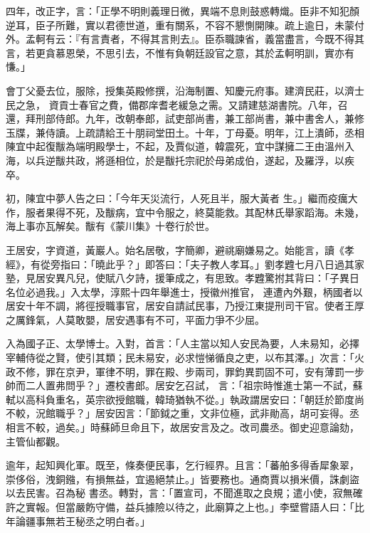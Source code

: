 \begin{pinyinscope}
 四年，改正字，言：「正學不明則義理日微，異端不息則鼓惑轉熾。臣非不知犯顏逆耳，臣子所難，實以君德世道，重有關系，不容不懇惻開陳。疏上逾日，未蒙付外。孟軻有云：『有言責者，不得其言則去』。臣忝職諫省，義當盡言，今既不得其言，若更貪慕恩榮，不思引去，不惟有負朝廷設官之意，其於孟軻明訓，實亦有慊。」



 會丁父憂去位，服除，授集英殿修撰，沿海制置、知慶元府事。建濟民莊，以濟士民之急，
 資貢士春官之費，備郡庠耆老緩急之需。又請建慈湖書院。八年，召還，拜刑部侍郎。九年，改朝奉郎，試吏部尚書，兼工部尚書，兼中書舍人，兼修玉牒，兼侍讀。上疏請給王十朋祠堂田土。十年，丁母憂。明年，江上潰師，丞相陳宜中起復黻為端明殿學士，不起，及賈似道，韓震死，宜中謀擁二王由溫州入海，以兵逆黻共政，將遜相位，於是黻托宗祀於母弟成伯，遂起，及羅浮，以疾卒。



 初，陳宜中夢人告之曰：「今年天災流行，人死且半，服大黃者
 生。」繼而疫癘大作，服者果得不死，及黻病，宜中令服之，終莫能救。其配林氏舉家蹈海。未幾，海上事亦瓦解矣。黻有《蒙川集》十卷行於世。



 王居安，字資道，黃巖人。始名居敬，字簡卿，避祧廟嫌易之。始能言，讀《孝經》，有從旁指曰：「曉此乎？」即答曰：「夫子教人孝耳。」劉孝韙七月八日過其家塾，見居安異凡兒，使賦八夕詩，援筆成之，有思致。孝韙驚拊其背曰：「子異日名位必過我。」入太學，淳熙十四年舉進士，授徽州推官，
 連遭內外艱，柄國者以居安十年不調，將徑授職事官，居安自請試民事，乃授江東提刑司干官。使者王厚之厲鋒氣，人莫敢嬰，居安遇事有不可，平面力爭不少屈。



 入為國子正、太學博士。入對，首言：「人主當以知人安民為要，人未易知，必擇宰輔侍從之賢，使引其類；民未易安，必求愷悌循良之吏，以布其澤。」次言：「火政不修，罪在京尹，軍律不明，罪在殿、步兩司，罪鈞異罰固不可，安有薄罰一步帥而二人置弗問乎？」遷校書郎。居安乞召試，
 言：「祖宗時惟進士第一不試，蘇軾以高科負重名，英宗欲授館職，韓琦猶執不從。」執政謂居安曰：「朝廷於節度尚不較，況館職乎？」居安因言：「節鉞之重，文非位極，武非勛高，胡可妄得。丞相言不較，過矣。」時蘇師旦命且下，故居安言及之。改司農丞。御史迎意論劾，主管仙都觀。



 逾年，起知興化軍。既至，條奏便民事，乞行經界。且言：「蕃舶多得香犀象翠，崇侈俗，洩銅鏹，有損無益，宜遏絕禁止。」皆要務也。通商賈以損米價，誅劇盜以去民害。召為秘
 書丞。轉對，言：「置宣司，不聞進取之良規；遣小使，寂無確許之實報。但當嚴飭守備，益兵據險以待之，此廟算之上也。」李壁嘗語人曰：「比年論疆事無若王秘丞之明白者。」




\end{pinyinscope}
